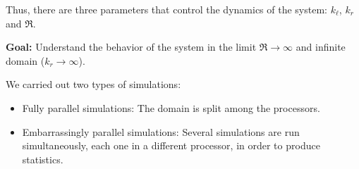 \documentclass{beamer} %
\begin{document}
\begin{frame}
	Thus, there are three parameters that control the dynamics of the system: $k_\ell$, $k_r$ and $\Re$.

	\textbf{Goal:} Understand the behavior of the system in the limit $\Re\to\infty$ and infinite domain ($k_r\to\infty$).

	We carried out two types of simulations:
	\begin{itemize}
		\item Fully parallel simulations: The domain is split among the processors.
		\item Embarrassingly parallel simulations: Several simulations are run simultaneously, each one in a different processor, in order to produce statistics.
	\end{itemize}
\end{frame}
\end{document}
